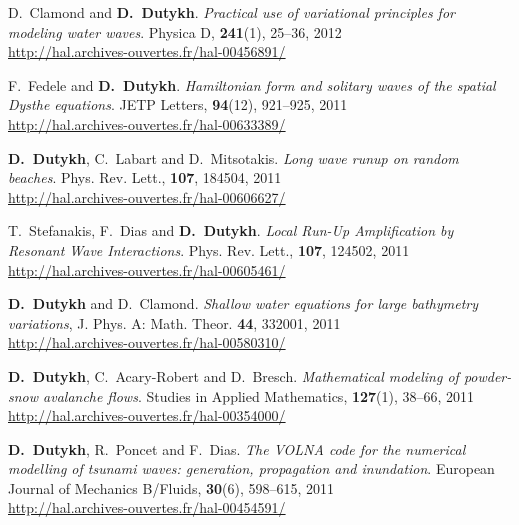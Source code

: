 \begin{etaremune}
  \item D.~Clamond and \textbf{D.~Dutykh}. \textit{Practical use of variational principles for modeling water waves}. Physica D, \textbf{241}(1), 25--36, 2012 \\ %
  \url{http://hal.archives-ouvertes.fr/hal-00456891/}


  \item F.~Fedele and \textbf{D.~Dutykh}. \textit{Hamiltonian form and solitary waves of the spatial Dysthe equations}. JETP Letters, \textbf{94}(12), 921--925, 2011 \\ %
  \url{http://hal.archives-ouvertes.fr/hal-00633389/}

  \item \textbf{D.~Dutykh}, C.~Labart and D.~Mitsotakis. \textit{Long wave runup on random beaches}. Phys. Rev. Lett., \textbf{107}, 184504, 2011 \\ %
  \url{http://hal.archives-ouvertes.fr/hal-00606627/}
  
  \item T.~Stefanakis, F.~Dias and \textbf{D.~Dutykh}. \textit{Local Run-Up Amplification by Resonant Wave Interactions}. Phys. Rev. Lett., \textbf{107}, 124502, 2011 \\ %
  \url{http://hal.archives-ouvertes.fr/hal-00605461/}
  
  \item \textbf{D.~Dutykh} and D.~Clamond. \textit{Shallow water equations for large bathymetry variations}, J. Phys. A: Math. Theor. \textbf{44}, 332001, 2011 \\ %
  \url{http://hal.archives-ouvertes.fr/hal-00580310/}
      
  \item \textbf{D.~Dutykh}, C.~Acary-Robert and D.~Bresch. \textit{Mathematical modeling of powder-snow avalanche flows}. Studies in Applied Mathematics, \textbf{127}(1), 38--66, 2011 \\ %
  \url{http://hal.archives-ouvertes.fr/hal-00354000/}

  \item \textbf{D.~Dutykh}, R.~Poncet and F.~Dias. \textit{The VOLNA code for the numerical modelling of tsunami waves: generation, propagation and inundation}. European Journal of Mechanics B/Fluids, \textbf{30}(6), 598--615, 2011 \\ %
  \url{http://hal.archives-ouvertes.fr/hal-00454591/}
    

\end{etaremune}
